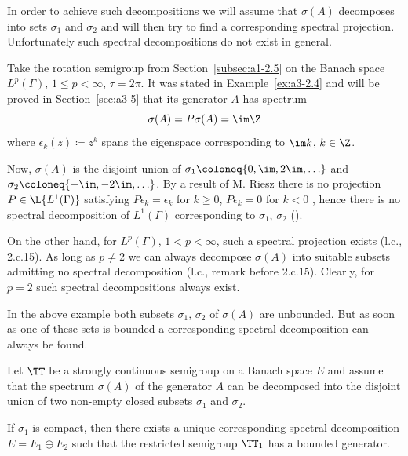 In order to achieve such decompositions we will assume that $\sigma(A)$ decomposes into sets $\sigma_{1}$ and $\sigma_{2}$ and will then try to find a corresponding spectral projection.
Unfortunately such spectral decompositions do not exist in general.
\begin{example}\label{ex:a3-3.2}
Take the rotation semigroup from Section~\ref{subsec:a1-2.5} on the Banach space $L^{p}(\Gamma)$, $1 \leq p < \infty$, $\tau = 2\pi$.
It was stated in Example~\ref{ex:a3-2.4} and will be proved in Section~\ref{sec:a3-5} that its generator $A$ has spectrum
\[
\sigma(A) = P\sigma(A) = \im\Z
\]
where $\epsilon_{k}(z) \coloneq z^{k}$ spans the eigenspace corresponding to $\im k$, $k \in \Z$.

Now, $\sigma(A)$ is the disjoint union of $\sigma_{1} \coloneq \{0,\im ,2\im, \ldots\}$ 
and $\sigma_{2} \coloneq \{-\im, -2\im, \ldots\}$.
By a result of M. Riesz there is no projection $P \in \L{L^{1}(\Gamma)}$ satisfying $P\epsilon_{k} = \epsilon_{k}$ for $k \geq 0$, $P\epsilon_{k} = 0$ for $k < 0$ , hence there is no spectral decomposition of\/ $L^{1}(\Gamma)$ corresponding to $\sigma_{1}$, $\sigma_{2}$ (\textcite[p.165]{lindenstraustzafriri:1979}).

On the other hand, for $L^{p}(\Gamma)$, $1 < p < \infty$, such a spectral projection exists (l.c., 2.c.15).
As long as $p \neq 2$ we can always decompose $\sigma(A)$ into suitable subsets admitting no spectral decomposition (l.c., remark before 2.c.15).
Clearly, for $p = 2$ such spectral decompositions always exist.
\end{example}
In the above example both subsets $\sigma_{1}$, $\sigma_{2}$ of\/ $\sigma(A)$ are unbounded.
But as soon as one of these sets is bounded a corresponding spectral decomposition can always be found.
\begin{theorem}\label{thm:a3-3.3}
Let $\TT$ be a strongly continuous semigroup on a Banach space $E$ and assume that the spectrum $\sigma(A)$ of the generator $A$ can be decomposed into the disjoint union of two non-empty closed subsets $\sigma_{1}$ and 
$\sigma_{2}$.

If\/ $\sigma_{1}$ is compact, then there exists a unique corresponding spectral decomposition $E = E_{1} \oplus E_{2}$ such that the restricted semigroup $\TT_{1}$ has a bounded generator.
\end{theorem}
